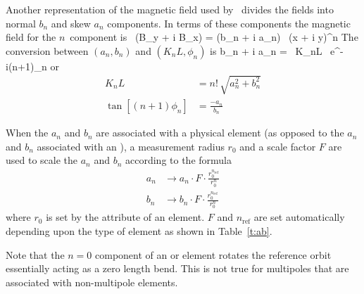 Another representation of the magnetic field used by \bmad\ divides
the fields into normal $b_n$ and skew $a_n$ components. In terms of
these components the magnetic field for the $n$\Th\ component is
\Begineq
   \, (B_y + i B_x) = (b_n + i a_n) \, (x + i y)^n
\Endeq
The conversion between $(a_n, b_n)$ and $(K_nL, \phi_n)$ is
\Begineq
  b_n + i a_n =  \, K_nL \, e^{-i(n+1)\phi_n}
\Endeq
or
\begin{align}
  K_n L &= n! \, \sqrt{a_n^2 + b_n^2} \\
  \tan[(n+1) \phi_n] &= \frac{-a_n}{b_n}
\end{align}

When the $a_n$ and $b_n$ are associated with a physical element (as
opposed to the $a_n$ and $b_n$ associated with an ),
a measurement radius $r_0$ and a scale factor $F$ are used to scale
the $a_n$ and $b_n$ according to the formula
\begin{align}
  a_n &\rightarrow 
        a_n \cdot F \cdot \frac{r_0^{n_\text{ref}}}{r_0^n} \nonumber \\
  b_n &\rightarrow 
        b_n \cdot F \cdot \frac{r_0^{n_\text{ref}}}{r_0^n}
\end{align}
where $r_0$ is set by the  attribute of an element. $F$ and
$n_\text{ref}$ are set automatically depending upon the type of
element as shown in Table~\ref{t:ab}.

Note that the $n = 0$ component of an  or 
element rotates the reference orbit essentially acting as a zero length bend.
This is not true for multipoles that are associated with 
non-multipole elements.

